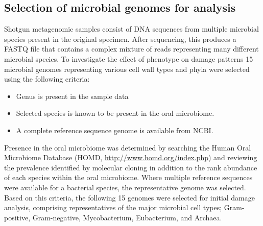 \documentclass[12pt, a4paper]{article}
\begin{document}
\subsection{Selection of microbial genomes for analysis}

Shotgun metagenomic samples consist of DNA sequences from multiple microbial species present in the original specimen. 
After sequencing, this produces a FASTQ file that contains a complex mixture of reads representing many different microbial species. 
To investigate the effect of phenotype on damage patterns 15 microbial genomes representing various cell wall types and phyla were selected using the following criteria: 

\begin{itemize}
	\item{Genus is present in the sample data}
	\item{Selected species is known to be present in the oral microbiome.}
		\item{A complete reference sequence genome is available from NCBI.}
\end{itemize}

Presence in the oral microbiome was determined by searching the Human Oral Microbiome Database (HOMD, \url{http://www.homd.org/index.php}) and reviewing the prevalence identified by molecular cloning in addition to the rank abundance of each species within the oral microbiome.
Where multiple reference sequences were available for a bacterial species, the representative genome was selected.
Based on this criteria, the following 15 genomes were selected for initial damage analysis, comprising representatives of the major microbial cell types; Gram-positive, Gram-negative, Mycobacterium, Eubacterium, and Archaea.
\end{document}
